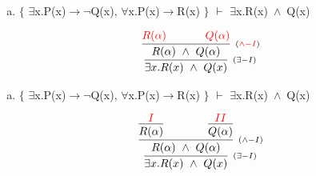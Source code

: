 \documentclass[aspectratio=43]{beamer}
\newcommand{\ria}{$\rightarrow$}
\newcommand{\fall}{$\forall$}
\newcommand{\ex}{$\exists$}
\newcommand{\nao}{$\neg$}
\newcommand{\andd}{$\wedge$}
\begin{document}
    \begin{frame}[fragile]
    
    	\begin{enumerate}[d)]
			\item $\{$ \ex x.P(x)\ria \nao Q(x), \fall x.P(x)\ria R(x) $\}$ $\vdash$ \ex x.R(x)\ \andd\ Q(x) \\
		\end{enumerate}
        
        \vspace{80pt}
        
        \[
        \begin{array}{c}
		
        	\infer[_{(\exists -I)}]
            	{\exists  x. R(x)\ \land\ Q(x)}
            	{\infer[_{(\textcolor{red}{\land -I})}] 
                	{R(\alpha)\ \land\ Q(\alpha)}
                	{\textcolor{red}{R(\alpha) \hspace{35pt} Q(\alpha)}}
                }
        
		\end{array}
        \]
        
	\end{frame}
    
    \begin{frame}[fragile]
    
    	\begin{enumerate}[d)]
			\item $\{$ \ex x.P(x)\ria \nao Q(x), \fall x.P(x)\ria R(x) $\}$ $\vdash$ \ex x.R(x)\ \andd\ Q(x) \\
		\end{enumerate}
        
        \vspace{80pt}
        
        \[
        \begin{array}{c}
		
        	\infer[_{(\exists -I)}]
            	{\exists  x. R(x)\ \land\ Q(x)}
            	{\infer[_{(\land -I)}] 
                	{R(\alpha)\ \land\ Q(\alpha)}
                	{\infer[] 
                    	{R(\alpha)} 
                        {\textcolor{red}{I}} \hspace{35pt}
                     \infer[] 
                     	{Q(\alpha)}
                     	{\textcolor{red}{II}}
                    }
                }
        
		\end{array}
        \]
        
	\end{frame}
    
\end{document}
